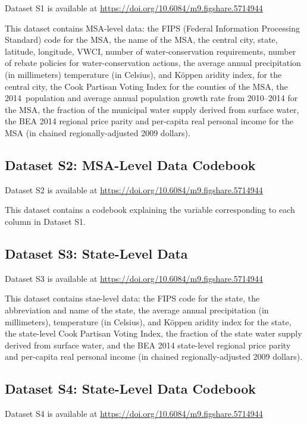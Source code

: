 \documentclass[draft]{agujournal}\usepackage{knitr}
\begin{document}
Dataset S1 is available at \url{https://doi.org/10.6084/m9.figshare.5714944}

This dataset contains MSA-level data: the FIPS (Federal Information Processing Standard) code for the MSA,
the name of the MSA, the central city, state, latitude, longitude,
VWCI, number of water-conservation requirements, number of rebate policies for water-conservation actions,
the average annual precipitation (in millimeters) temperature (in Celsius), and K\"oppen aridity index, for the central city,
the Cook Partisan Voting Index for the counties of the MSA,
the 2014~population and average annual population growth rate from 2010--2014 for the MSA,
the fraction of the municipal water supply derived from surface water,
the BEA 2014 regional price parity and per-capita real personal income for the MSA (in chained regionally-adjusted 2009 dollars).

\subsection*{Dataset S2: MSA-Level Data Codebook}

Dataset S2 is available at \url{https://doi.org/10.6084/m9.figshare.5714944}

This dataset contains a codebook explaining the variable corresponding to each column in Dataset S1.

\subsection*{Dataset S3: State-Level Data}

Dataset S3 is available at \url{https://doi.org/10.6084/m9.figshare.5714944}

This dataset contains stae-level data: the FIPS code for the state, the abbreviation and name of the state,
the average annual precipitation (in millimeters), temperature (in Celsius), and K\"oppen aridity index for the state,
the state-level Cook Partisan Voting Index,
the fraction of the state water supply derived from surface water,
and the BEA 2014 state-level regional price parity and per-capita real personal income (in chained regionally-adjusted 2009 dollars).

\subsection*{Dataset S4: State-Level Data Codebook}

Dataset S4 is available at \url{https://doi.org/10.6084/m9.figshare.5714944}
\end{document}
